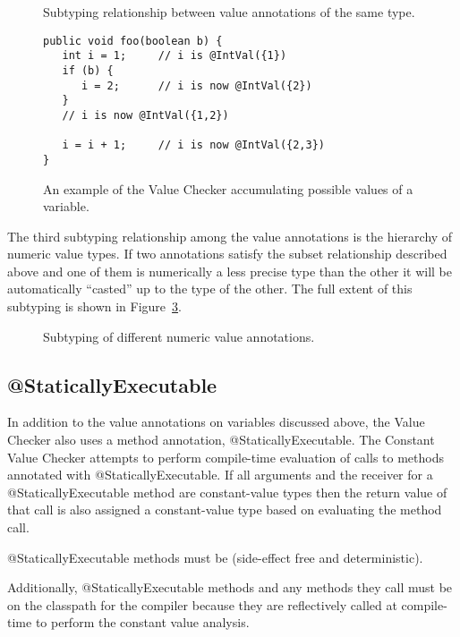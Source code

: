 \begin{figure}
\caption{Subtyping relationship between value annotations of the same type.}
\label{fig-value-subtype}
\end{figure}

\begin{figure}
\begin{Verbatim}
public void foo(boolean b) {
   int i = 1;     // i is @IntVal({1})
   if (b) {  
      i = 2;      // i is now @IntVal({2})
   }        
   // i is now @IntVal({1,2})
   
   i = i + 1;     // i is now @IntVal({2,3})
}
\end{Verbatim}
\caption{An example of the Value Checker accumulating possible values
    of a variable.}
\label{fig-value-multivalue}
\end{figure}

The third subtyping relationship among the value annotations is the
hierarchy of numeric value types. If two annotations satisfy the
subset relationship described above and one of them is numerically a
less precise type than the other it will be automatically ``casted''
up to the type of the other. The full extent of this subtyping is
shown in Figure~\ref{fig-value-subtyping}.

\begin{figure}
\caption{Subtyping of different numeric value annotations.}
\label{fig-value-subtyping}
\end{figure}

\subsection{@StaticallyExecutable}
In addition to the value annotations on variables discussed above, the
Value Checker also uses a method annotation,
@StaticallyExecutable. The Constant Value Checker attempts to perform
compile-time evaluation of calls to methods annotated with
@StaticallyExecutable. If all arguments and the receiver for a
@StaticallyExecutable method are constant-value types then the return
value of that call is also assigned a constant-value type based on
evaluating the method call.

@StaticallyExecutable methods must
be  (side-effect free and
deterministic).

Additionally, @StaticallyExecutable methods and any methods they call must be on
the classpath for the compiler because they are reflectively called at
compile-time to perform the constant value analysis.

